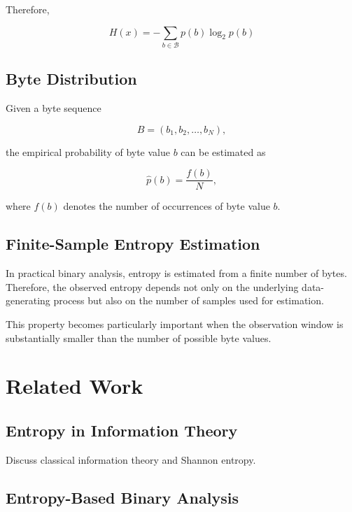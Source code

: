 \documentclass[10pt,letterpaper]{article}
\begin{document}
Therefore,

\begin{equation}
    H(x)
    =
    -\sum_{b\in\mathcal{B}}
    p(b)\log_2p(b)
\end{equation}

\subsection{Byte Distribution}

Given a byte sequence

\begin{equation}
    B = (b_1, b_2,\ldots,b_N),
\end{equation}

the empirical probability of byte value $b$ can be estimated as

\begin{equation}
    \hat{p}(b) = \frac{f(b)}{N},
\end{equation}

where $f(b)$ denotes the number of occurrences of byte value $b$.

\subsection{Finite-Sample Entropy Estimation}

In practical binary analysis, entropy is estimated from a finite
number of bytes. Therefore, the observed entropy depends not only on the underlying
data-generating process but also on the number of samples used for estimation.

This property becomes particularly important when the observation window is substantially 
smaller than the number of possible byte values.



\section{Related Work}

\subsection{Entropy in Information Theory}

Discuss classical information theory and Shannon entropy.

\subsection{Entropy-Based Binary Analysis}
\end{document}
